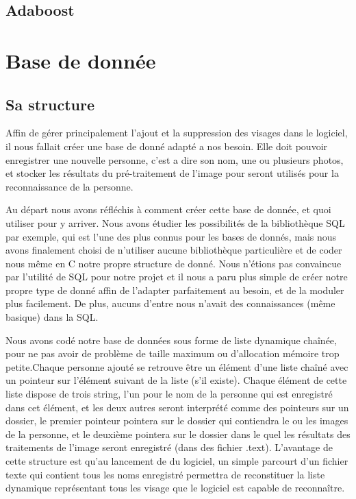 \documentclass[12pt,a4paper]{article}
\begin{document}
\subsection{Adaboost}


\newpage
\section{Base de donnée}

\subsection{Sa structure}





 Affin de gérer principalement l'ajout et la suppression des visages dans le logiciel, il nous fallait créer une base de donné adapté a nos besoin. Elle doit pouvoir enregistrer une nouvelle personne, c'est a dire son nom, une ou plusieurs photos, et stocker les résultats du pré-traitement de l'image pour seront utilisés pour la reconnaissance de la personne.

Au départ nous avons réfléchis à comment créer cette base de donnée, et quoi utiliser pour y arriver. Nous avons étudier les possibilités de la bibliothèque SQL par exemple, qui est l'une des plus connus pour les bases de donnés, mais nous avons finalement choisi de n'utiliser aucune bibliothèque particulière et de coder nous même en C notre propre structure de donné. Nous n'étions pas convaincue par l'utilité de SQL pour notre projet et il nous a paru plus simple de créer notre propre type de donné affin de l'adapter parfaitement au besoin, et de la moduler plus facilement. De plus, aucuns d'entre nous n'avait des connaissances (même basique) dans la SQL.


Nous avons codé notre base de données sous forme de liste dynamique chaînée, pour ne pas avoir de problème de taille maximum ou d'allocation mémoire trop petite.Chaque personne ajouté se retrouve être un élément d'une liste chaîné avec un pointeur sur l’élément suivant de la liste (s'il existe). Chaque élément de cette liste dispose de trois string, l'un pour le nom de la personne qui est enregistré dans cet élément, et les deux autres seront interprété comme des pointeurs sur un dossier, le premier pointeur pointera sur le dossier qui contiendra le ou les images de la personne, et le deuxième pointera sur le dossier dans le quel les résultats des traitements de l'image seront enregistré (dans des fichier .text). L'avantage de cette structure est qu'au lancement de du logiciel, un simple parcourt d'un fichier texte qui contient tous les noms enregistré permettra de reconstituer la liste dynamique représentant tous les visage que le logiciel est capable de reconnaître.
\end{document}

